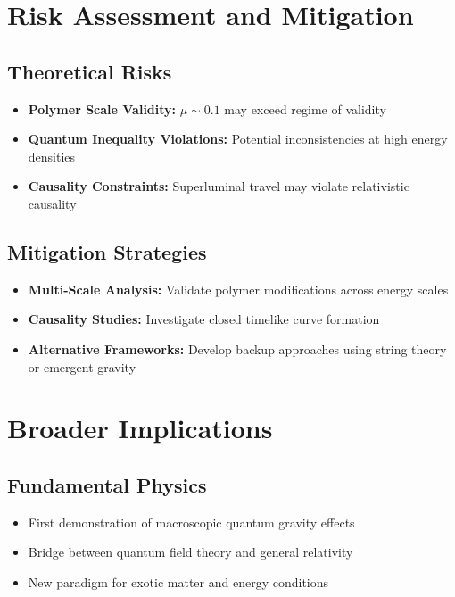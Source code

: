 \documentclass[11pt]{article}
\begin{document}
\section{Risk Assessment and Mitigation}

\subsection{Theoretical Risks}
\begin{itemize}
  \item \textbf{Polymer Scale Validity:} $\mu \sim 0.1$ may exceed regime of validity
  \item \textbf{Quantum Inequality Violations:} Potential inconsistencies at high energy densities
  \item \textbf{Causality Constraints:} Superluminal travel may violate relativistic causality
\end{itemize}

\subsection{Mitigation Strategies}
\begin{itemize}
  \item \textbf{Multi-Scale Analysis:} Validate polymer modifications across energy scales
  \item \textbf{Causality Studies:} Investigate closed timelike curve formation
  \item \textbf{Alternative Frameworks:} Develop backup approaches using string theory or emergent gravity
\end{itemize}

\section{Broader Implications}

\subsection{Fundamental Physics}
\begin{itemize}
  \item First demonstration of macroscopic quantum gravity effects
  \item Bridge between quantum field theory and general relativity
  \item New paradigm for exotic matter and energy conditions
\end{itemize}
\end{document}
